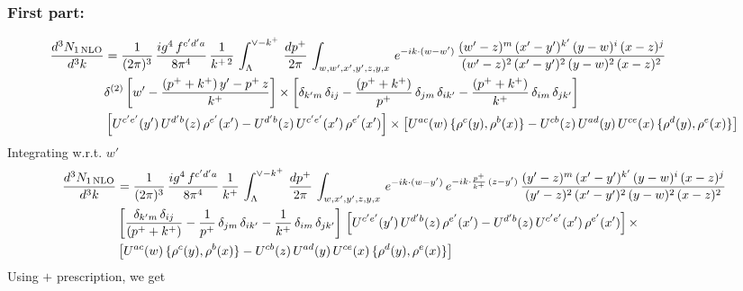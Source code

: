 \documentclass[9pt]{article}
\numberwithin{equation}{section}
\begin{document}
\subsubsection{First part:\,}
\begin{align}
     \frac{d^{3}N_{1\,\rm NLO}}{d^{3}k} & =  \frac{1}{(2\pi)^{3}}\,\frac{ig^{4}\,f^{c'd'a}}{8\pi^{4}}\, \frac{1}{k^{+\,2}}\,\int_{\Lambda}^{\vee-k^{+}}\, \frac{dp^{+}}{2\pi}\, \int_{w,w',x',y',z,y,x}\, e^{-ik\cdot (w-w')}\, \frac{(w'-z)^{m}\,(x'-y')^{k'}\,(y-w)^{i}\,(x-z)^{j}}{(w'-z)^{2}\,(x'-y')^{2}\,(y-w)^{2}\,(x-z)^{2}}\notag \\ & \delta^{(2)}\left[w'-\frac{(p^{+}+k^{+})\,y'-p^{+}\,z}{k^{+}}\right]\times \left[\delta_{k'm}\,\delta_{ij}-\frac{(p^{+}+k^{+})}{p^{+}}\,\delta_{jm}\,\delta_{ik'}-\frac{(p^{+}+k^{+})}{k^{+}}\, \delta_{im}\, \delta_{jk'}\right]\notag \\ & \left[U^{c'e'}(y')\,U^{d'b}(z)\,\rho^{e'}(x')-U^{d'b}(z)\,U^{c'e'}(x')\,\rho^{e'}(x')\right]\times \left[U^{ac}(w)\, \{\rho^{c}(y),\rho^{b}(x)\}-U^{cb}(z)\,U^{ad}(y)\,U^{ce}(x)\,\{\rho^{d}(y),\rho^{e}(x)\}\right]
\end{align}
Integrating w.r.t. $w'$
\begin{align}
     \frac{d^{3}N_{1\,\rm NLO}}{d^{3}k} & = \frac{1}{(2\pi)^{3}}\, \frac{ig^{4}\,f^{c'd'a}}{8\pi^{4}}\, \frac{1}{k^{+}}\,\int_{\Lambda}^{\vee-k^{+}}\,  \frac{dp^{+}}{2\pi}\, \int_{w,x',y',z,y,x}\, e^{-ik\cdot (w-y')}\, e^{-ik\cdot \frac{p^{+}}{k^{+}}\,(z-y')}\,\frac{(y'-z)^{m}\,(x'-y')^{k'}\,(y-w)^{i}\,(x-z)^{j}}{(y'-z)^{2}\,(x'-y')^{2}\,(y-w)^{2}\,(x-z)^{2}}\notag \\ & \left[\frac{\delta_{k'm}\,\delta_{ij}}{(p^{+}+k^{+})}-\frac{1}{p^{+}}\,\delta_{jm}\,\delta_{ik'}-\frac{1}{k^{+}}\, \delta_{im}\, \delta_{jk'}\right]\, \left[U^{c'e'}(y')\,U^{d'b}(z)\,\rho^{e'}(x')-U^{d'b}(z)\,U^{c'e'}(x')\,\rho^{e'}(x')\right]\times\notag \\ &  \left[U^{ac}(w)\, \{\rho^{c}(y),\rho^{b}(x)\}-U^{cb}(z)\,U^{ad}(y)\,U^{ce}(x)\,\{\rho^{d}(y),\rho^{e}(x)\}\right]
\end{align} 
Using $+$ prescription, we get
\end{document}
